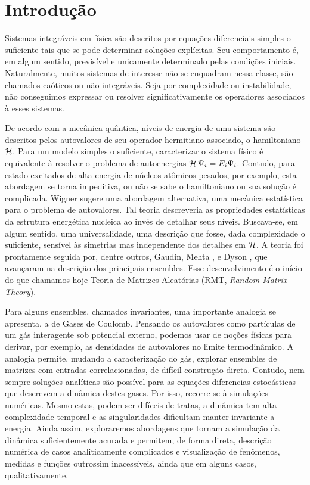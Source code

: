\chapter{Introdução}
\label{Capitulo: Intro}

Sistemas integráveis em física são descritos por equações diferenciais simples o suficiente tais que se pode determinar soluções explícitas. Seu comportamento é, em algum sentido, previsível e unicamente determinado pelas condições iniciais. Naturalmente, muitos sistemas de interesse não se enquadram nessa classe, são chamados caóticos ou não integráveis. Seja por complexidade ou instabilidade, não conseguimos expressar ou resolver significativamente os operadores associados à esses sistemas. 

De acordo com a mecânica quântica, níveis de energia de uma sistema são descritos pelos autovalores de seu operador hermitiano associado, o hamiltoniano $\operatorname{\mathcal{H}}$. Para um modelo simples o suficiente, caracterizar o sistema físico é equivalente à resolver o problema de autoenergias $\operatorname{\mathcal{H}} \Psi_i = E_i \Psi_i$. Contudo, para estado excitados de alta energia de núcleos atômicos pesados, por exemplo, esta abordagem se torna impeditiva, ou não se sabe o hamiltoniano ou sua solução é complicada. Wigner sugere uma abordagem alternativa, uma mecânica estatística para o problema de autovalores. Tal teoria descreveria as propriedades estatísticas da estrutura energética nucleica ao invés de detalhar seus níveis. Buscava-se, em algum sentido, uma universalidade, uma descrição que fosse, dada complexidade o suficiente, sensível às simetrias mas independente dos detalhes em $\operatorname{\mathcal{H}}$. A teoria foi prontamente seguida por, dentre outros, Gaudin, Mehta \cite{MehtaGaudin}, e Dyson \cite{Dyson}, que avançaram na descrição dos principais ensembles. Esse desenvolvimento é o início do que chamamos hoje Teoria de Matrizes Aleatórias (RMT, \textit{Random Matrix Theory}).

Para alguns ensembles, chamados invariantes, uma importante analogia se apresenta, a de Gases de Coulomb. Pensando os autovalores como partículas de um gás interagente sob potencial externo, podemos usar de noções físicas para derivar, por exemplo, as densidades de autovalores no limite termodinâmico. A analogia permite, mudando a caracterização do gás, explorar ensembles de matrizes com entradas correlacionadas, de difícil construção direta. Contudo, nem sempre soluções analíticas são possível para as equações diferencias estocásticas que descrevem a dinâmica destes gases. Por isso, recorre-se à simulações numéricas. Mesmo estas, podem ser difíceis de tratas, a dinâmica tem alta complexidade temporal e as singularidades dificultam manter invariante a energia. Ainda assim, exploraremos abordagens que tornam a simulação da dinâmica suficientemente acurada e permitem, de forma direta, descrição numérica de casos analiticamente complicados e visualização de fenômenos, medidas e funções outrossim inacessíveis, ainda que em alguns casos, qualitativamente.


